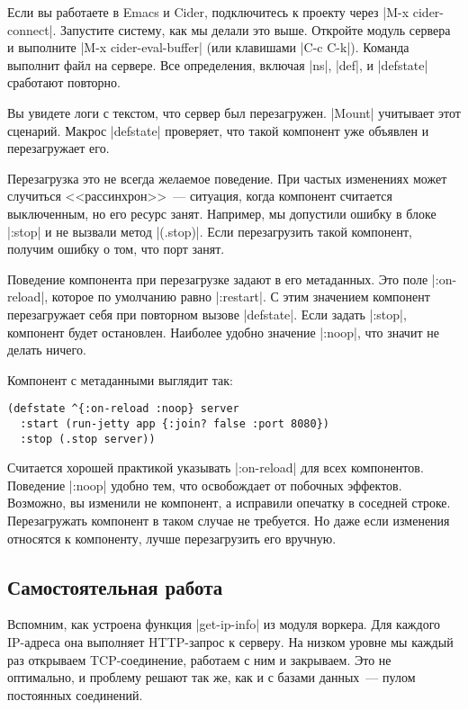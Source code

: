 Если вы работаете в Emacs и Cider, подключитесь к проекту через \spverb|M-x
cider-connect|. Запустите систему, как мы делали это выше. Откройте модуль
сервера и выполните \spverb|M-x cider-eval-buffer| (или клавишами \spverb|C-c
C-k|). Команда выполнит файл на сервере. Все определения, включая \spverb|ns|,
\spverb|def|, и \spverb|defstate| сработают повторно.

Вы увидете логи с текстом, что сервер был перезагружен. \spverb|Mount| учитывает
этот сценарий. Макрос \spverb|defstate| проверяет, что такой компонент уже
объявлен и перезагружает его.

Перезагрузка это не всегда желаемое поведение. При частых изменениях может
случиться <<рассинхрон>>~--- ситуация, когда компонент считается выключенным, но
его ресурс занят. Например, мы допустили ошибку в блоке \spverb|:stop| и не
вызвали метод \spverb|(.stop)|. Если перезагрузить такой компонент, получим
ошибку о том, что порт занят.


Поведение компонента при перезагрузке задают в его метаданных. Это поле
\spverb|:on-reload|, которое по умолчанию равно \spverb|:restart|. С этим значением компонент
перезагружает себя при повторном вызове \spverb|defstate|. Если задать \spverb|:stop|,
компонент будет остановлен. Наиболее удобно значение \spverb|:noop|, что значит не
делать ничего.

Компонент с метаданными выглядит так:

\begin{verbatim}
(defstate ^{:on-reload :noop} server
  :start (run-jetty app {:join? false :port 8080})
  :stop (.stop server))
\end{verbatim}

Считается хорошей практикой указывать \spverb|:on-reload| для всех
компонентов. Поведение \spverb|:noop| удобно тем, что освобождает от побочных
эффектов. Возможно, вы изменили не компонент, а исправили опечатку в соседней
строке. Перезагружать компонент в таком случае не требуется. Но даже если
изменения относятся к компоненту, лучше перезагрузить его вручную.

\subsection{Самостоятельная работа}

Вспомним, как устроена функция \spverb|get-ip-info| из модуля воркера. Для каждого
IP-адреса она выполняет HTTP-запрос к серверу. На низком уровне мы каждый раз
открываем TCP-соединение, работаем с ним и закрываем. Это не оптимально, и
проблему решают так же, как и с базами данных~--- пулом постоянных соединений.

